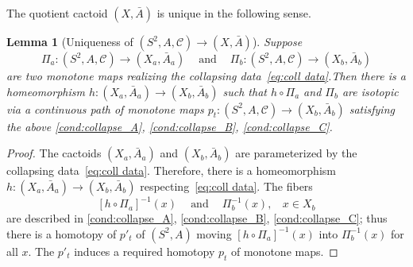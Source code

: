 \documentclass{amsart}
\theoremstyle{plain}
\newtheorem{lemma}[theorem]{Lemma}
\theoremstyle{definition}
\theoremstyle{remark}
\renewcommand{\sp}{{\ \ }}
\newcommand{\CC}{{\mathcal C}}
\begin{document}
The quotient cactoid $(X,\bar A)$ is unique in the following sense.


\begin{lemma}[Uniqueness of $(S^2,A,\CC)\to (X,\bar A)$]
\label{lem:uniq of X}
 Suppose 
\[\Pi_a\colon (S^2,A, \CC)\to (X_a,\bar A_a)\sp\sp\text{ and }\sp\sp \Pi_b\colon (S^2,A, \CC)\to (X_b,\bar A_b)\]
are two monotone maps realizing the collapsing data~\eqref{eq:coll data}.Then there is a homeomorphism $h\colon  (X_a,\bar A_a)\to  (X_b,\bar A_b)$ such that $h\circ \Pi_a$ and $\Pi_b$ are isotopic via a continuous path of monotone maps $p_t\colon (S^2,A,\CC)\to (X_b,\bar A_b)$ satisfying the above \ref{cond:collapse_A}, \ref{cond:collapse_B}, \ref{cond:collapse_C}.
\end{lemma}
\begin{proof}
   The cactoids $(X_a,\bar A_a)$ and $(X_b,\bar A_b)$ are parameterized by the collapsing data~\eqref{eq:coll data}. Therefore, there is a homeomorphism $h\colon  (X_a,\bar A_a)\to  (X_b,\bar A_b)$ respecting~\eqref{eq:coll data}. The fibers \[ [h\circ \Pi_a]^{-1}(x)\sp\sp\text{ and }\sp\sp \Pi^{-1}_b(x), \sp\sp x\in X_b\] are described in \ref{cond:collapse_A}, \ref{cond:collapse_B}, \ref{cond:collapse_C}; thus there is a homotopy of $p'_t$ of $(S^2,A)$ moving $[h\circ \Pi_a]^{-1}(x)$ into $\Pi^{-1}_b(x)$ for all $x$. The $p'_t$ induces a required homotopy $p_t$ of monotone maps.
\end{proof}
\end{document}
